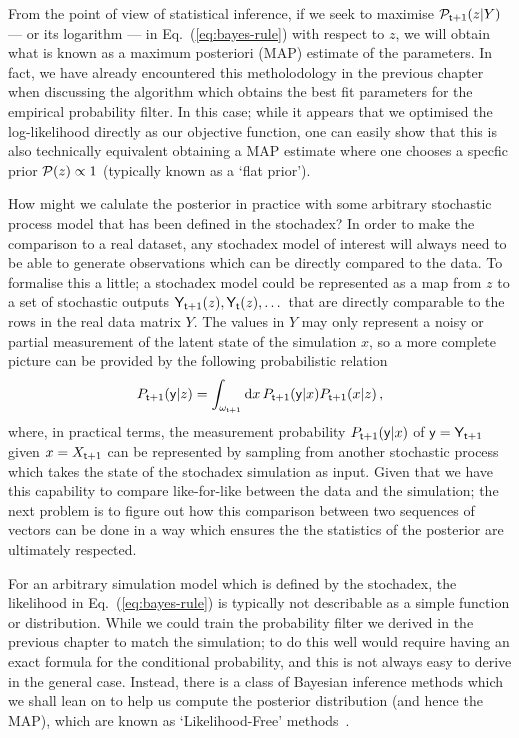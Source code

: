 From the point of view of statistical inference, if we seek to maximise ${\cal P}_{{\sf t}+1}(z \vert Y)$ --- or its logarithm --- in Eq.~(\ref{eq:bayes-rule}) with respect to $z$, we will obtain what is known as a maximum posteriori (MAP) estimate of the parameters. In fact, we have already encountered this metholodology in the previous chapter when discussing the algorithm which obtains the best fit parameters for the empirical probability filter. In this case; while it appears that we optimised the log-likelihood directly as our objective function, one can easily show that this is also technically equivalent obtaining a MAP estimate where one chooses a specfic prior ${\cal P} (z) \propto 1$ (typically known as a `flat prior').

How might we calulate the posterior in practice with some arbitrary stochastic process model that has been defined in the stochadex? In order to make the comparison to a real dataset, any stochadex model of interest will always need to be able to generate observations which can be directly compared to the data. To formalise this a little; a stochadex model could be represented as a map from $z$ to a set of stochastic outputs ${\sf Y}_{{\sf t}+1}(z), {\sf Y}_{{\sf t}}(z), \dots$ that are directly comparable to the rows in the real data matrix $Y$. The values in $Y$ may only represent a noisy or partial measurement of the latent state of the simulation $x$, so a more complete picture can be provided by the following probabilistic relation
\begin{align}
P_{{\sf t}+1}({\sf y} \vert z) = \int_{\omega_{{\sf t}+1}}{\rm d}x\, P_{{\sf t}+1}({\sf y} \vert x)P_{{\sf t}+1}(x\vert z) \label{eq:simulation-measurement} \,,
\end{align}
where, in practical terms, the measurement probability $P_{{\sf t}+1}({\sf y} \vert x)$ of ${\sf y}={\sf Y}_{{\sf t}+1}$ given $x=X_{{\sf t}+1}$ can be represented by sampling from another stochastic process which takes the state of the stochadex simulation as input. Given that we have this capability to compare like-for-like between the data and the simulation; the next problem is to figure out how this comparison between two sequences of vectors can be done in a way which ensures the the statistics of the posterior are ultimately respected. 

For an arbitrary simulation model which is defined by the stochadex, the likelihood in Eq.~(\ref{eq:bayes-rule}) is typically not describable as a simple function or distribution. While we could train the probability filter we derived in the previous chapter to match the simulation; to do this well would require having an exact formula for the conditional probability, and this is not always easy to derive in the general case. Instead, there is a class of Bayesian inference methods which we shall lean on to help us compute the posterior distribution (and hence the MAP), which are known as `Likelihood-Free' methods~\cite{sisson2018handbook,price2018bayesian,wood2010statistical,drovandi2022comparison}.


